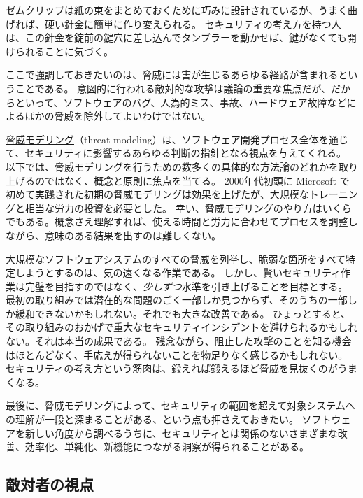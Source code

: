 \documentclass[uplatex]{jsarticle}
\def\label#1{}%
\begin{document}
\begin{exa}[ゼムクリップ]\label{exa:ch2-paperclip}
ゼムクリップは紙の束をまとめておくために巧みに設計されているが、うまく曲げれば、硬い針金に簡単に作り変えられる。
セキュリティの考え方を持つ人は、この針金を錠前の鍵穴に差し込んでタンブラーを動かせば、鍵がなくても開けられることに気づく。
\end{exa}

ここで強調しておきたいのは、脅威には害が生じるあらゆる経路が含まれるということである。
意図的に行われる敵対的な攻撃は議論の重要な焦点だが、だからといって、ソフトウェアのバグ、人為的ミス、事故、ハードウェア故障などによるほかの脅威を除外してよいわけではない。

\underline{脅威モデリング}（threat modeling）は、ソフトウェア開発プロセス全体を通じて、セキュリティに影響するあらゆる判断の指針となる視点を与えてくれる。
以下では、脅威モデリングを行うための数多くの具体的な方法論のどれかを取り上げるのではなく、概念と原則に焦点を当てる。
2000年代初頭に Microsoft で初めて実践された初期の脅威モデリングは効果を上げたが、大規模なトレーニングと相当な労力の投資を必要とした。
幸い、脅威モデリングのやり方はいくらでもある。概念さえ理解すれば、使える時間と労力に合わせてプロセスを調整しながら、意味のある結果を出すのは難しくない。

大規模なソフトウェアシステムのすべての脅威を列挙し、脆弱な箇所をすべて特定しようとするのは、気の遠くなる作業である。
しかし、賢いセキュリティ作業は完璧を目指すのではなく、\emph{少しずつ}水準を引き上げることを目標とする。
最初の取り組みでは潜在的な問題のごく一部しか見つからず、そのうちの一部しか緩和できないかもしれない。それでも大きな改善である。
ひょっとすると、その取り組みのおかげで重大なセキュリティインシデントを避けられるかもしれない。それは本当の成果である。
残念ながら、阻止した攻撃のことを知る機会はほとんどなく、手応えが得られないことを物足りなく感じるかもしれない。
セキュリティの考え方という筋肉は、鍛えれば鍛えるほど脅威を見抜くのがうまくなる。

最後に、脅威モデリングによって、セキュリティの範囲を超えて対象システムへの理解が一段と深まることがある、という点も押さえておきたい。
ソフトウェアを新しい角度から調べるうちに、セキュリティとは関係のないさまざまな改善、効率化、単純化、新機能につながる洞察が得られることがある。

\subsection{敵対者の視点}\label{subsec:ch2-adversarial-perspective}
\end{document}
